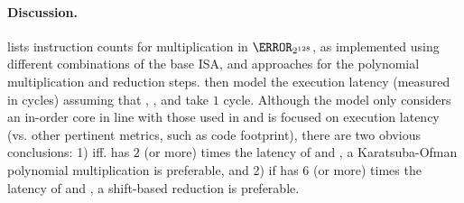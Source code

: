 \paragraph{Discussion.}

lists instruction counts for 
multiplication in $\F_{2^{128}}$,
as implemented using different combinations of the base ISA, and approaches
for the polynomial multiplication and reduction steps.
then model the execution latency 
(measured in cycles)
assuming that , , and  take $1$ cycle.
Although the model only considers an in-order core in line with those used
in  and is focused on execution latency
(vs. other pertinent metrics, such as code footprint),
there are two obvious conclusions:
1) iff.
   has $2$ (or more) times the latency of
    and ,
   a 
   Karatsuba-Ofman 
   polynomial multiplication
   is preferable,
   and
2) if
   has $6$ (or more) times the latency of
    and ,
   a shift-based 
   reduction 
   is preferable.

